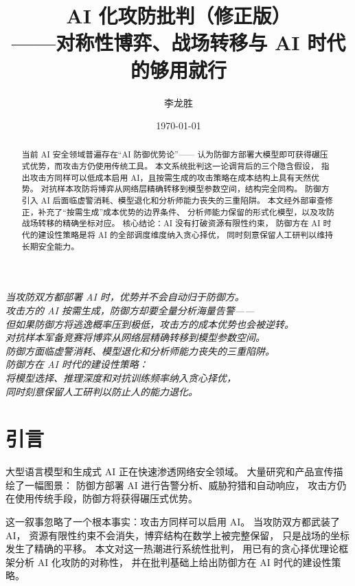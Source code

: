 \documentclass[11pt,a4paper]{article}
\title{AI 化攻防批判（修正版）\\
——对称性博弈、战场转移与 AI 时代的够用就行}
\author{李龙胜}
\date{\today}
\begin{document}
\maketitle

\begin{center}
\textit{
当攻防双方都部署 AI 时，优势并不会自动归于防御方。\\
攻击方的 AI 按需生成，防御方却要全量分析海量告警——\\
但如果防御方将逃逸概率压到极低，攻击方的成本优势也会被逆转。\\
对抗样本军备竞赛将博弈从网络层精确转移到模型参数空间。\\
防御方面临虚警消耗、模型退化和分析师能力丧失的三重陷阱。\\
防御方在 AI 时代的建设性策略：\\
将模型选择、推理深度和对抗训练频率纳入贪心择优，\\
同时刻意保留人工研判以防止人的能力退化。\\
}
\end{center}

\vspace{5mm}

\begin{abstract}
当前 AI 安全领域普遍存在“AI 防御优势论”——
认为防御方部署大模型即可获得碾压式优势，而攻击方仍使用传统工具。
本文系统批判这一论调背后的三个隐含假设，
指出攻击方同样可以低成本启用 AI，且按需生成的攻击策略在成本结构上具有天然优势。
对抗样本攻防将博弈从网络层精确转移到模型参数空间，结构完全同构。
防御方引入 AI 后面临虚警消耗、模型退化和分析师能力丧失的三重陷阱。
本文经外部审查修正，补充了“按需生成”成本优势的边界条件、
分析师能力保留的形式化模型，以及攻防战场转移的精确坐标对应。
核心结论：AI 没有打破资源有限性约束，
防御方在 AI 时代的建设性策略是将 AI 的全部调度维度纳入贪心择优，
同时刻意保留人工研判以维持长期安全能力。
\end{abstract}

\tableofcontents

\section{引言}

大型语言模型和生成式 AI 正在快速渗透网络安全领域。
大量研究和产品宣传描绘了一幅图景：
防御方部署 AI 进行告警分析、威胁狩猎和自动响应，
攻击方仍在使用传统手段，防御方将获得碾压式优势。

这一叙事忽略了一个根本事实：攻击方同样可以启用 AI。
当攻防双方都武装了 AI，
资源有限性约束不会消失，博弈结构在数学上被完整保留，
只是战场的坐标发生了精确的平移。
本文对这一热潮进行系统性批判，
用已有的贪心择优理论框架分析 AI 化攻防的对称性，
并在批判基础上给出防御方在 AI 时代的建设性策略。
\end{document}
